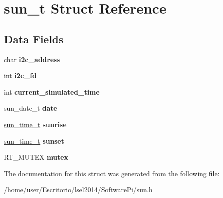 \hypertarget{structsun__t}{\section{sun\-\_\-t \-Struct \-Reference}
\label{structsun__t}
}
\subsection*{\-Data \-Fields}
\begin{DoxyCompactItemize}
\item 
\hypertarget{structsun__t_a8e03db45d360669cba100a0fe3445fca}{char {\bfseries i2c\-\_\-address}}\label{structsun__t_a8e03db45d360669cba100a0fe3445fca}

\item 
\hypertarget{structsun__t_a0d3cd0b18e49aa09b8659af0243558b8}{int {\bfseries i2c\-\_\-fd}}\label{structsun__t_a0d3cd0b18e49aa09b8659af0243558b8}

\item 
\hypertarget{structsun__t_ae59e216e84b13dbba2af5c721690b5d4}{int {\bfseries current\-\_\-simulated\-\_\-time}}\label{structsun__t_ae59e216e84b13dbba2af5c721690b5d4}

\item 
\hypertarget{structsun__t_aa1c742f06f54307d592846f7ca57e169}{sun\-\_\-date\-\_\-t {\bfseries date}}\label{structsun__t_aa1c742f06f54307d592846f7ca57e169}

\item 
\hypertarget{structsun__t_a1f5068d1921a39f0de857b9ac86b6064}{\hyperlink{structsun__time__t}{sun\-\_\-time\-\_\-t} {\bfseries sunrise}}\label{structsun__t_a1f5068d1921a39f0de857b9ac86b6064}

\item 
\hypertarget{structsun__t_ab5f2acf9c038544cf25b17efed70a398}{\hyperlink{structsun__time__t}{sun\-\_\-time\-\_\-t} {\bfseries sunset}}\label{structsun__t_ab5f2acf9c038544cf25b17efed70a398}

\item 
\hypertarget{structsun__t_a026a0d348095315f97ca47409a2b8ee2}{\-R\-T\-\_\-\-M\-U\-T\-E\-X {\bfseries mutex}}\label{structsun__t_a026a0d348095315f97ca47409a2b8ee2}

\end{DoxyCompactItemize}


\-The documentation for this struct was generated from the following file\-:\begin{DoxyCompactItemize}
\item 
/home/user/\-Escritorio/lsel2014/\-Software\-Pi/sun.\-h\end{DoxyCompactItemize}
